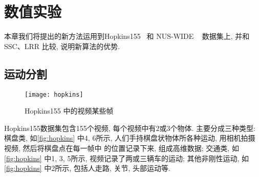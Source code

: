 \chapter{数值实验}\label{chp:experiments}
本章我们将提出的新方法运用到Hopkins155~\cite{tron2007benchmark} 和 NUS-WIDE
~\cite{chua2009NUS} 数据集上, 并和SSC、LRR 比较, 说明新算法的优势.

\section{运动分割}
\begin{figure}[hb]
  \centering
  \texttt{[image: hopkins]}
  \caption{Hopkins155 中的视频某些帧}
  \label{fig:hopkins}
\end{figure}
Hopkins155数据集包含155个视频, 每个视频中有2或3个物体.
主要分成三种类型: 棋盘类, 如\autoref{fig:hopkins} 中4, 6所示,
人们手持棋盘状物体所各种运动, 用相机拍摄视频, 然后将棋盘点在每一帧中
的位置记录下来, 组成高维数据; 交通类, 如\autoref{fig:hopkins} 中1, 3, 5所示,
视频记录了两或三辆车的运动; 其他非刚性运动, 如\autoref{fig:hopkins} 中2所示,
包括人走路, 关节, 头部运动等.

